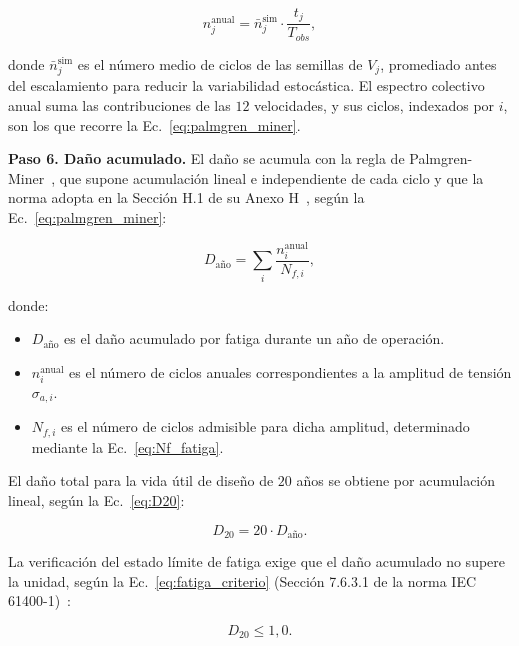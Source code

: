 \begin{equation}
    n_{j}^{\text{anual}} = \bar{n}_{j}^{\text{sim}} \cdot \frac{t_j}{T_{obs}},
    \label{eq:espectro_anual}
\end{equation}

donde $\bar{n}_{j}^{\text{sim}}$ es el número medio de ciclos de las semillas de $V_j$, promediado antes del escalamiento para reducir la variabilidad estocástica. El espectro colectivo anual suma las contribuciones de las $12$ velocidades, y sus ciclos, indexados por $i$, son los que recorre la Ec.~\ref{eq:palmgren_miner}.

\medskip
\noindent\textbf{Paso 6. Daño acumulado.}
El daño se acumula con la regla de Palmgren-Miner~\parencite{Palmgren1924,Miner1945}, que supone acumulación lineal e independiente de cada ciclo y que la norma adopta en la Sección H.1 de su Anexo H~\parencite{IEC61400-1}, según la Ec.~\ref{eq:palmgren_miner}:

\begin{equation}
    D_{\text{año}} = \sum_{i} \frac{n_i^{\text{anual}}}{N_{f,i}},
    \label{eq:palmgren_miner}
\end{equation}

donde:
\begin{itemize}
    \item $D_{\text{año}}$ es el daño acumulado por fatiga durante un año de operación.
    \item $n_i^{\text{anual}}$ es el número de ciclos anuales correspondientes a la amplitud de tensión $\sigma_{a,i}$.
    \item $N_{f,i}$ es el número de ciclos admisible para dicha amplitud, determinado mediante la Ec.~\ref{eq:Nf_fatiga}.
\end{itemize}

El daño total para la vida útil de diseño de $20$ años se obtiene por acumulación lineal, según la Ec.~\ref{eq:D20}:

\begin{equation}
    D_{20} = 20 \cdot D_{\text{año}}.
    \label{eq:D20}
\end{equation}

La verificación del estado límite de fatiga exige que el daño acumulado no supere la unidad, según la Ec.~\ref{eq:fatiga_criterio} (Sección 7.6.3.1 de la norma IEC 61400-1)~\parencite*{IEC61400-1}:

\begin{equation}
    D_{20} \leq 1{,}0.
    \label{eq:fatiga_criterio}
\end{equation}

